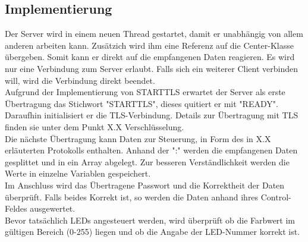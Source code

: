 \subsection{Implementierung}
Der Server wird in einem neuen Thread gestartet, damit er unabhängig von allem anderen arbeiten kann. Zusätzich wird ihm eine Referenz auf die Center-Klasse übergeben. Somit kann er direkt auf die empfangenen Daten reagieren. Es wird nur eine Verbindung zum Server erlaubt. Falls sich ein weiterer Client verbinden will, wird die Verbindung direkt beendet.\\
Aufgrund der Implementierung von STARTTLS erwartet der Server als erste Übertragung das Stichwort "STARTTLS", dieses quitiert er mit "READY". Daraufhin initialisiert er die TLS-Verbindung. Details zur Übertragung mit TLS finden sie unter dem Punkt X.X Verschlüsselung. \\
Die nächste Übertragung kann Daten zur Steuerung, in Form des in X.X erläuterten Protokolls enthalten. Anhand der ":" werden die empfangenen Daten gesplittet und in ein Array abgelegt. Zur besseren Verständlichkeit werden die Werte in einzelne Variablen gespeichert. \\
Im Anschluss wird das Übertragene Passwort und die Korrektheit der Daten überprüft. Falls beides Korrekt ist, so werden die Daten anhand ihres Control-Feldes ausgewertet. \\
Bevor tatsächlich LEDs angesteuert werden, wird überprüft ob die Farbwert im gültigen Bereich (0-255) liegen und ob die Angabe der LED-Nummer korrekt ist.\\

